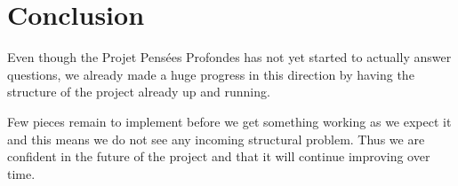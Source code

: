 \section{Conclusion}

Even though the Projet Pensées Profondes has not yet started to actually
answer questions, we already made a huge progress in this direction
by having the structure of the project already up and running.

Few pieces remain to implement before we get something working as we
expect it and this means we do not see any incoming structural problem.
Thus we are confident in the future of the project and that it will
continue improving over time.
